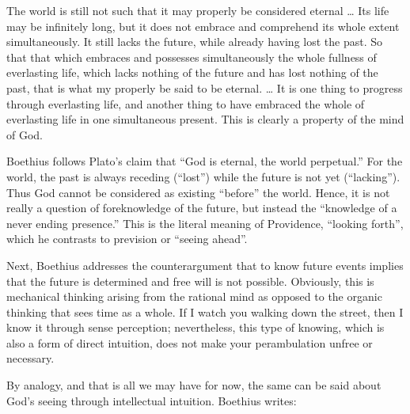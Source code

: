\begin{quotex}
The world is still not such that it may properly be considered eternal … Its life may be infinitely long, but it does not embrace and comprehend its whole extent simultaneously. It still lacks the future, while already having lost the past. So that that which embraces and possesses simultaneously the whole fullness of everlasting life, which lacks nothing of the future and has lost nothing of the past, that is what my properly be said to be eternal. … It is one thing to progress through everlasting life, and another thing to have embraced the whole of everlasting life in one simultaneous present. This is clearly a property of the mind of God. 

\end{quotex}
Boethius follows Plato's claim that “God is eternal, the world perpetual.” For the world, the past is always receding (“lost”) while the future is not yet (“lacking”). Thus God cannot be considered as existing “before” the world. Hence, it is not really a question of foreknowledge of the future, but instead the “knowledge of a never ending presence.” This is the literal meaning of Providence, “looking forth”, which he contrasts to prevision or “seeing ahead”.

Next, Boethius addresses the counterargument that to know future events implies that the future is determined and free will is not possible. Obviously, this is mechanical thinking arising from the rational mind as opposed to the organic thinking that sees time as a whole. If I watch you walking down the street, then I know it through sense perception; nevertheless, this type of knowing, which is also a form of direct intuition, does not make your perambulation unfree or necessary.

By analogy, and that is all we may have for now, the same can be said about God's seeing through intellectual intuition. Boethius writes:

